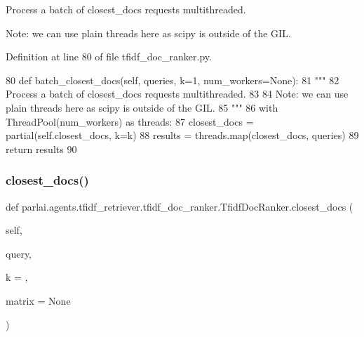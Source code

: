 \begin{DoxyVerb}Process a batch of closest_docs requests multithreaded.

Note: we can use plain threads here as scipy is outside of the GIL.
\end{DoxyVerb}
 

Definition at line 80 of file tfidf\+\_\+doc\+\_\+ranker.\+py.


\begin{DoxyCode}
80     \textcolor{keyword}{def }batch\_closest\_docs(self, queries, k=1, num\_workers=None):
81         \textcolor{stringliteral}{"""}
82 \textcolor{stringliteral}{        Process a batch of closest\_docs requests multithreaded.}
83 \textcolor{stringliteral}{}
84 \textcolor{stringliteral}{        Note: we can use plain threads here as scipy is outside of the GIL.}
85 \textcolor{stringliteral}{        """}
86         with ThreadPool(num\_workers) \textcolor{keyword}{as} threads:
87             closest\_docs = partial(self.closest\_docs, k=k)
88             results = threads.map(closest\_docs, queries)
89         \textcolor{keywordflow}{return} results
90 
\end{DoxyCode}
\mbox{\label{classparlai_1_1agents_1_1tfidf__retriever_1_1tfidf__doc__ranker_1_1TfidfDocRanker_a0573e296758121d2c40563e93acdf366}} 
\subsubsection{\texorpdfstring{closest\+\_\+docs()}{closest\_docs()}}
{\footnotesize\ttfamily def parlai.\+agents.\+tfidf\+\_\+retriever.\+tfidf\+\_\+doc\+\_\+ranker.\+Tfidf\+Doc\+Ranker.\+closest\+\_\+docs (\begin{DoxyParamCaption}\item[{}]{self,  }\item[{}]{query,  }\item[{}]{k = {},  }\item[{}]{matrix = {\ttfamily None} }\end{DoxyParamCaption})}

